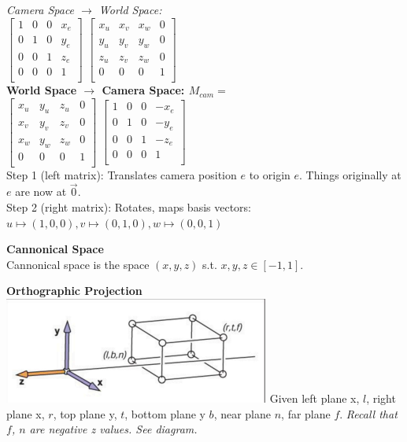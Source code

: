 \documentclass[letterpaper, 8pt]{extarticle}
\begin{document}
\begin{multicols*}{4}
\textit{Camera Space $\to$ World Space:}\\
\(
\begin{bmatrix}
    1 & 0 & 0 & x_e \\
    0 & 1 & 0 & y_e \\
    0 & 0 & 1 & z_e \\
    0 & 0 & 0 & 1 \\
\end{bmatrix}
\)
\(
\begin{bmatrix}
    x_u & x_v & x_w & 0 \\
    y_u & y_v & y_w & 0 \\
    z_u & z_v & z_w & 0 \\
    0 & 0 & 0 & 1 \\
\end{bmatrix}
\)\\

\textbf{World Space $\to$ Camera Space: $M_{cam}=$}\\
\(
\begin{bmatrix}
    x_u & y_u & z_u & 0 \\
    x_v & y_v & z_v & 0 \\
    x_w & y_w & z_w & 0 \\
    0 & 0 & 0 & 1 \\
\end{bmatrix}
\)
\(
\begin{bmatrix}
    1 & 0 & 0 & -x_e \\
    0 & 1 & 0 & -y_e \\
    0 & 0 & 1 & -z_e \\
    0 & 0 & 0 & 1 \\
\end{bmatrix}
\)
\\
Step 1 (left matrix): Translates camera position $e$ to origin $e$. Things originally at $e$ are now at $\vec{0}$.\\
Step 2 (right matrix): Rotates, maps basis vectors: $u \mapsto (1,0,0), v \mapsto (0,1,0), w \mapsto (0,0,1)$ 

\textbf{Cannonical Space}\\
Cannonical space is the space $(x, y, z)$ s.t. $x,y,z \in [-1, 1]$.

\textbf{Orthographic Projection}\\

\includegraphics[width=\linewidth]{cam-ortho.png} 
Given left plane x, $l$, right plane x, $r$, top plane y, $t$, bottom plane y $b$, near plane $n$, far plane $f$.
\textit{Recall that $f$, $n$ are negative z values. See diagram.}


\end{multicols*}
\end{document}
